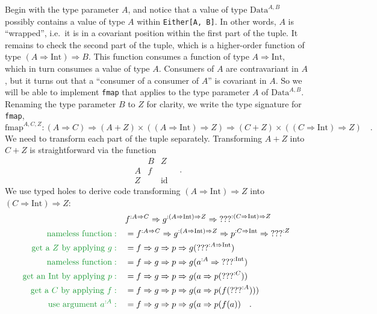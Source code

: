 Begin with the type parameter $A$, and notice that a value of type
$\text{Data}^{A,B}$ possibly contains a value of type $A$ within
\lstinline!Either[A, B]!. In other words, $A$ is ``wrapped'',
i.e.~it is in a covariant position within the first part of the tuple.
It remains to check the second part of the tuple, which is a higher-order
function of type $\left(A\Rightarrow\text{Int}\right)\Rightarrow B$.
This function consumes a function of type $A\Rightarrow\text{Int}$,
which in turn consumes a value of type $A$. Consumers of $A$ are
contravariant in $A$, but it turns out that a ``consumer of a consumer
of $A$'' is covariant in $A$. So we will be able to implement \lstinline!fmap!
that applies to the type parameter $A$ of $\text{Data}^{A,B}$. Renaming
the type parameter $B$ to $Z$ for clarity, we write the type signature
for \lstinline!fmap!,
\[
\text{fmap}^{A,C,Z}:\left(A\Rightarrow C\right)\Rightarrow\left(A+Z\right)\times\left(\left(A\Rightarrow\text{Int}\right)\Rightarrow Z\right)\Rightarrow\left(C+Z\right)\times\left(\left(C\Rightarrow\text{Int}\right)\Rightarrow Z\right)\quad.
\]
We need to transform each part of the tuple separately. Transforming
$A+Z$ into $C+Z$ is straightforward via the function
\[
\begin{array}{|c||cc|}
 & B & Z\\
\hline A & f & \\
Z &  & \text{id}
\end{array}\quad.
\]
We use typed holes to derive code transforming $\left(A\Rightarrow\text{Int}\right)\Rightarrow Z$
into $\left(C\Rightarrow\text{Int}\right)\Rightarrow Z$:
\begin{align*}
 & f^{:A\Rightarrow C}\Rightarrow g^{:\left(A\Rightarrow\text{Int}\right)\Rightarrow Z}\Rightarrow\text{???}^{:\left(C\Rightarrow\text{Int}\right)\Rightarrow Z}\\
{\color{greenunder}\text{nameless function}:}\quad & =f^{:A\Rightarrow C}\Rightarrow g^{:\left(A\Rightarrow\text{Int}\right)\Rightarrow Z}\Rightarrow p^{:C\Rightarrow\text{Int}}\Rightarrow\text{???}^{:Z}\\
{\color{greenunder}\text{get a }Z\text{ by applying }g:}\quad & =f\Rightarrow g\Rightarrow p\Rightarrow g(\text{???}^{:A\Rightarrow\text{Int}})\\
{\color{greenunder}\text{nameless function}:}\quad & =f\Rightarrow g\Rightarrow p\Rightarrow g(a^{:A}\Rightarrow\text{???}^{:\text{Int}})\\
{\color{greenunder}\text{get an Int by applying }p:}\quad & =f\Rightarrow g\Rightarrow p\Rightarrow g(a\Rightarrow p(\text{???}^{:C}))\\
{\color{greenunder}\text{get a }C\text{ by applying }f:}\quad & =f\Rightarrow g\Rightarrow p\Rightarrow g(a\Rightarrow p(f(\text{???}^{:A})))\\
{\color{greenunder}\text{use argument }a^{:A}:}\quad & =f\Rightarrow g\Rightarrow p\Rightarrow g(a\Rightarrow p(f(a))\quad.
\end{align*}
